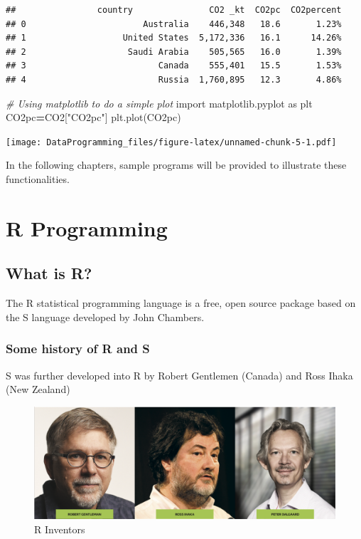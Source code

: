 \documentclass[]{book}
\newenvironment{Shaded}{\begin{snugshade}}{\end{snugshade}}
\newcommand{\CommentTok}[1]{\textcolor[rgb]{0.56,0.35,0.01}{\textit{#1}}}
\newcommand{\ImportTok}[1]{#1}
\newcommand{\NormalTok}[1]{#1}
\newcommand{\OperatorTok}[1]{\textcolor[rgb]{0.81,0.36,0.00}{\textbf{#1}}}
\newcommand{\StringTok}[1]{\textcolor[rgb]{0.31,0.60,0.02}{#1}}
\begin{document}
\begin{verbatim}
##                country               CO2 _kt  CO2pc  CO2percent
## 0                       Australia    446,348   18.6       1.23%
## 1                   United States  5,172,336   16.1      14.26%
## 2                    Saudi Arabia    505,565   16.0       1.39%
## 3                          Canada    555,401   15.5       1.53%
## 4                          Russia  1,760,895   12.3       4.86%
\end{verbatim}

\begin{Shaded}
\begin{Highlighting}[]
\CommentTok{# Using matplotlib to do a simple plot}
\ImportTok{import}\NormalTok{ matplotlib.pyplot }\ImportTok{as}\NormalTok{ plt}
\NormalTok{CO2pc}\OperatorTok{=}\NormalTok{CO2[}\StringTok{"CO2pc"}\NormalTok{]}
\NormalTok{plt.plot(CO2pc)}
\end{Highlighting}
\end{Shaded}

\texttt{[image: DataProgramming\_files/figure-latex/unnamed-chunk-5-1.pdf]}

In the following chapters, sample programs will be provided to illustrate these functionalities.

\hypertarget{r-programming}{%
\chapter{R Programming}\label{r-programming}}

\hypertarget{what-is-r}{%
\section{What is R?}\label{what-is-r}}

The R statistical programming language is a free, open source package based on the S language developed by John Chambers.

\hypertarget{some-history-of-r-and-s}{%
\subsection{Some history of R and S}\label{some-history-of-r-and-s}}

S was further developed into R by Robert Gentlemen (Canada) and Ross Ihaka (New Zealand)

\begin{figure}
\includegraphics[width=1\linewidth]{Rinventors} \caption{R Inventors}\label{fig:Rinventors}
\end{figure}
\end{document}
